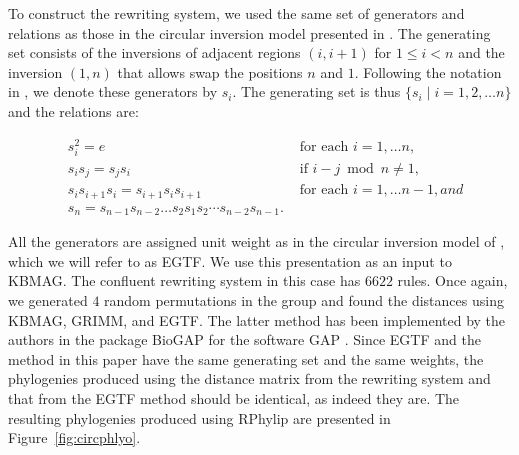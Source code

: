 \documentclass[utf8]{Frontiers_LaTex_Templates/frontiersFPHY} %
\newcommand{\id}{e}
\numberwithin{equation}{section}
\begin{document}
To construct the rewriting system, we used the same set of generators and relations as those in the circular inversion model presented in \citet{egrinagy2013group}. The generating set consists of the inversions of adjacent regions $(i, i+1)$ for $1 \leq i < n$ and the inversion $(1,n)$ that allows swap the positions $n$ and $1$. Following the notation in \citet{egrinagy2013group}, we denote these generators by $s_i$. The generating set is thus $\{s_i \mid i=1,2,\dots n\}$ and the relations are:

\begin{align*}
&s_i^2 = \id & \text{ for each } i=1, \dots n, \\
&s_i s_j = s_j s_i & \text{ if } i-j \bmod n \neq 1, \\
&s_i s_{i+1} s_i = s_{i+1} s_i s_{i+1} & \text{ for each } i=1, \dots n-1, and\\
&s_n = s_{n-1} s_{n-2} \dots s_2 s_1 s_2 \cdots s_{n-2} s_{n-1}.
\end{align*}

All the generators are assigned unit weight as in the circular inversion model of \citet{egrinagy2013group}, which we will refer to as EGTF. 
We use this presentation as an input to KBMAG.  The confluent rewriting system in this case has $6622$ rules.  Once again, we generated $4$ random permutations in the group and found the distances using KBMAG, GRIMM, and EGTF. The latter method has been implemented by the authors in the package BioGAP \citep{egri2014bacterial} for the software GAP \citep{Sch97}. Since EGTF and the method in this paper have the same generating set and the same weights, the phylogenies produced using the distance matrix from the rewriting system and that from the EGTF method should be identical, as indeed they are.
The resulting phylogenies produced using RPhylip are presented in Figure~\ref{fig:circphlyo}. 
\end{document}
